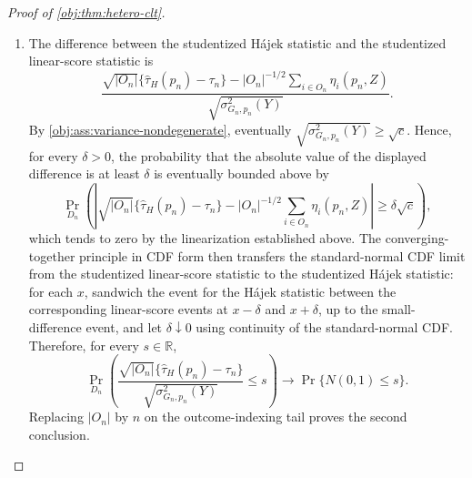 \begin{proof}[Proof of \cref{obj:thm:hetero-clt}]
\begin{enumerate}
\item The difference between the studentized Hájek statistic and the studentized linear-score statistic is
\[
\frac{
\sqrt{|O_n|}\{\widehat\tau_H(p_n)-\tau_n\}
-|O_n|^{-1/2}\sum_{i\in O_n}\eta_i(p_n,Z)}
{\sqrt{\sigma^2_{G_n,p_n}(Y)}}.
\]
By \cref{obj:ass:variance-nondegenerate}, eventually \(\sqrt{\sigma^2_{G_n,p_n}(Y)}\ge\sqrt c\).  Hence, for every \(\delta>0\), the probability that the absolute value of the displayed difference is at least \(\delta\) is eventually bounded above by
\[
\Pr_{D_n}\!\left(
\left|
\sqrt{|O_n|}\{\widehat\tau_H(p_n)-\tau_n\}
-|O_n|^{-1/2}\sum_{i\in O_n}\eta_i(p_n,Z)
\right|
\ge\delta\sqrt c
\right),
\]
which tends to zero by the linearization established above.  The converging-together principle in CDF form then transfers the standard-normal CDF limit from the studentized linear-score statistic to the studentized Hájek statistic: for each \(x\), sandwich the event for the Hájek statistic between the corresponding linear-score events at \(x-\delta\) and \(x+\delta\), up to the small-difference event, and let \(\delta\downarrow0\) using continuity of the standard-normal CDF.  Therefore, for every \(s\in\mathbb R\),
\[
\Pr_{D_n}\!\left(
\frac{\sqrt{|O_n|}\{\widehat\tau_H(p_n)-\tau_n\}}
{\sqrt{\sigma^2_{G_n,p_n}(Y)}}\le s
\right)
\longrightarrow\Pr\{N(0,1)\le s\}.
\]
Replacing \(|O_n|\) by \(n\) on the outcome-indexing tail proves the second conclusion.
\end{enumerate}
\end{proof}

